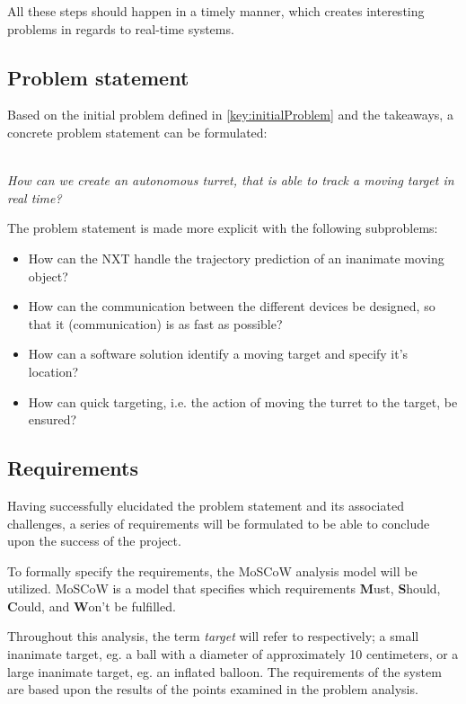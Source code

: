 All these steps should happen in a timely manner, which creates interesting problems in regards to real-time systems.

\subsection{Problem statement}
Based on the initial problem defined in \autoref{key:initialProblem} and the takeaways, a concrete problem statement can be formulated:\\~\\

\begin{center}
	\textit{\large{How can we create an autonomous turret, that is able to track a moving target in real time?}}
\end{center}

The problem statement is made more explicit with the following subproblems:
\begin{center}
	\begin{itemize}
		\item How can the NXT handle the trajectory prediction of an inanimate moving object?
		\item How can the communication between the different devices be designed, so that it (communication) is as fast as possible?
		\item How can a software solution identify a moving target and specify it's location?
		\item How can quick targeting, i.e. the action of moving the turret to the target, be ensured?
	\end{itemize}
\end{center}


\subsection{Requirements}\label{subsec:requirements}
Having successfully elucidated the problem statement and its associated challenges, a series of requirements will be formulated to be able to conclude upon the success of the project.

To formally specify the requirements, the MoSCoW analysis model will be utilized.
MoSCoW is a model that specifies which requirements \textbf{M}ust, \textbf{S}hould, \textbf{C}ould, and \textbf{W}on't be fulfilled.

Throughout this analysis, the term \textit{target} will refer to respectively; a small inanimate target, eg{.} a ball with a diameter of approximately 10 centimeters, or a large inanimate target, eg{.} an inflated balloon.
The requirements of the system are based upon the results of the points examined in the problem analysis.

